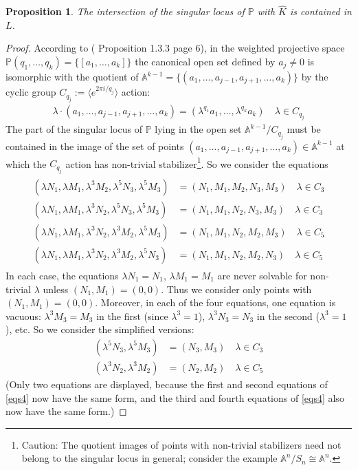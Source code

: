 \documentclass[12pt]{article}
\numberwithin{equation}{section}
\theoremstyle{plain}
\newtheorem{proposition}[definition]{Proposition}
\theoremstyle{definition}
\renewcommand{\P}{\mathbb{P}}
\newcommand{\A}{\mathbb{A}}
\begin{document}
\begin{proposition} The intersection of the singular locus of $\P$ with $\widehat{K}$ is contained in $L$.
\end{proposition}
\begin{proof} According to (\cite{dolgachevWeighted} Proposition 1.3.3 page 6), in the weighted projective space $\P(q_1,\dots,q_k)=\{[a_1,\dots,a_k]\}$ the canonical open set defined by $a_j\neq 0$ is isomorphic with the quotient of $\A^{k-1}=\{(a_1,\dots,a_{j-1},a_{j+1},\dots, a_k)\}$ by the cyclic group $C_{q_{j}}:=\langle e^{2\pi i/q_j} \rangle$ action:
\begin{align*}
\lambda \cdot (a_1,\dots,a_{j-1},a_{j+1},\dots, a_k)=(\lambda^{q_1}a_1,\dots,\lambda^{q_k}a_k) \quad \lambda \in C_{q_{j}}
\end{align*}
The part of the singular locus of $\P$ lying in the open set $\A^{k-1}/C_{q_{j}}$ must be contained in the image of the set of points $(a_1,\dots,a_{j-1},a_{j+1},\dots,a_k)\in \A^{k-1}$ at which the $C_{q_{j}}$ action has non-trivial stabilizer\footnote{Caution: The quotient images of points with non-trivial stabilizers need not belong to the singular locus in general; consider the example $\A^{n}/S_{n}\cong \A^{n}$.}. So we consider the equations
\begin{align}\label{eqs4}
\begin{split}
(\lambda N_1,\lambda M_1,\lambda^{3}M_2,\lambda^{5}N_3,\lambda^{5}M_3)&=(N_1,M_1,M_2,N_3,M_3) \quad \lambda \in C_3\\
(\lambda N_1,\lambda M_1,\lambda^{3}N_2,\lambda^{5}N_3,\lambda^{5}M_3)&=(N_1,M_1,N_2,N_3,M_3) \quad \lambda \in C_3\\
(\lambda N_1,\lambda M_1,\lambda^{3}N_2,\lambda^{3}M_2,\lambda^{5}M_3)&=(N_1,M_1,N_2,M_2,M_3) \quad \lambda \in C_5\\
(\lambda N_1,\lambda M_1,\lambda^{3}N_2,\lambda^{3}M_2,\lambda^{5}N_3)&	=(N_1,M_1,N_2,M_2,N_3) \quad \lambda \in C_5
\end{split}
\end{align}
In each case, the equations $\lambda N_1=N_1$, $\lambda M_1=M_1$ are never solvable for non-trivial $\lambda$ unless $(N_1,M_1)=(0,0)$. Thus we consider only points with $(N_1,M_1)=(0,0)$. Moreover, in each of the four equations, one equation is vacuous: $\lambda^{3}M_3=M_3$ in the first (since $\lambda^{3}=1$), $\lambda^{3}N_3=N_3$ in the second ($\lambda^{3}=1$), etc. So we consider the simplified versions:
\begin{align*}
(\lambda^{5}N_3,\lambda^{5}M_3)&=(N_3,M_3) \quad \lambda \in C_3\\
(\lambda^{3}N_2,\lambda^{3}M_2)&=(N_2,M_2) \quad \lambda \in C_5
\end{align*}
(Only two equations are displayed, because the first and second equations of \ref{eqs4} now have the same form, and the third and fourth equations of \ref{eqs4} also now have the same form.)


\end{proof}
\end{document}
